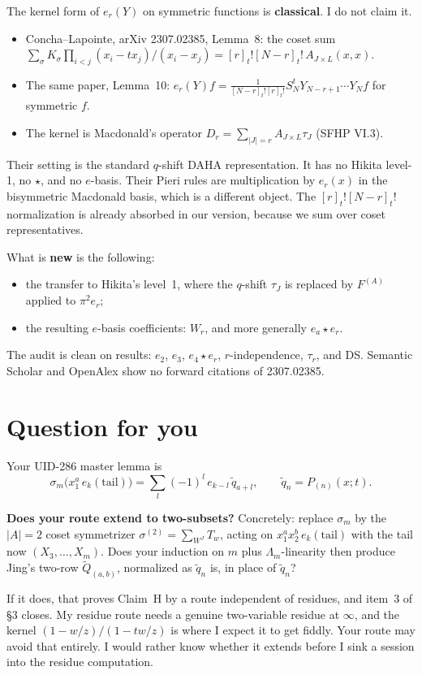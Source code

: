 \documentclass[11pt]{article}
\newcommand{\tl}{\mathrm{tail}}
\newcommand{\st}{\star}
\newcommand{\tn}[1]{[#1]_t}
\begin{document}
The kernel form of $e_r(Y)$ on symmetric functions is \textbf{classical}. I do not claim it.
\begin{itemize}
\item Concha--Lapointe, arXiv 2307.02385, Lemma~8: the coset sum $\sum_{\sigma}K_\sigma\prod_{i<j}(x_i-tx_j)/(x_i-x_j)=\tn{r}!\tn{N-r}!\,A_{J\times L}(x,x)$.
\item The same paper, Lemma~10: $e_r(Y)f=\tfrac{1}{\tn{N-r}!\tn{r}!}S^t_NY_{N-r+1}\cdots Y_Nf$ for symmetric $f$.
\item The kernel is Macdonald's operator $D_r=\sum_{|J|=r}A_{J\times L}\tau_J$ (SFHP VI.3).
\end{itemize}
Their setting is the standard $q$-shift DAHA representation. It has no Hikita level-1, no $\st$, and no $e$-basis. Their Pieri rules are multiplication by $e_r(x)$ in the bisymmetric Macdonald basis, which is a different object. The $\tn{r}!\tn{N-r}!$ normalization is already absorbed in our version, because we sum over coset representatives.

What is \textbf{new} is the following:
\begin{itemize}
\item the transfer to Hikita's level~1, where the $q$-shift $\tau_J$ is replaced by $F^{(A)}$ applied to $\pi^2e_r$;
\item the resulting $e$-basis coefficients: $W_r$, and more generally $e_a\st e_r$.
\end{itemize}
The audit is clean on results: $e_2$, $e_3$, $e_4\st e_r$, $r$-independence, $\tau_r$, and DS. Semantic Scholar and OpenAlex show no forward citations of 2307.02385.

\section{Question for you}

Your UID-286 master lemma is
\[
\sigma_m\big(x_1^a\,e_k(\tl)\big)=\sum_l(-1)^l\,e_{k-l}\,\tilde q_{a+l},\qquad \tilde q_n=P_{(n)}(x;t).
\]

\textbf{Does your route extend to two-subsets?} Concretely: replace $\sigma_m$ by the $|A|=2$ coset symmetrizer $\sigma^{(2)}=\sum_{W^J}T_w$, acting on $x_1^ax_2^b\,e_k(\text{tail})$ with the tail now $(X_3,\dots,X_m)$. Does your induction on $m$ plus $\Lambda_m$-linearity then produce Jing's two-row $\tilde Q_{(a,b)}$, normalized as $\tilde q_n$ is, in place of $\tilde q_n$?

If it does, that proves Claim~H by a route independent of residues, and item~3 of \S3 closes. My residue route needs a genuine two-variable residue at $\infty$, and the kernel $(1-w/z)/(1-tw/z)$ is where I expect it to get fiddly. Your route may avoid that entirely. I would rather know whether it extends before I sink a session into the residue computation.
\end{document}
